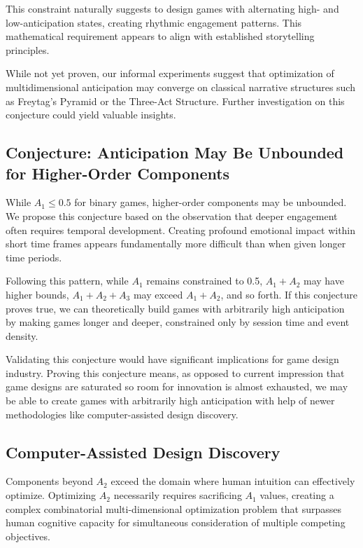 \documentclass{article}
\begin{document}
This constraint naturally suggests to design games with alternating high- and low-anticipation states, creating rhythmic engagement patterns.
This mathematical requirement appears to align with established storytelling principles.

While not yet proven, our informal experiments suggest that optimization of multidimensional anticipation may converge on classical narrative structures such as Freytag's Pyramid or the Three-Act Structure.
Further investigation on this conjecture could yield valuable insights.

\subsection{Conjecture: Anticipation May Be Unbounded for Higher-Order Components}

While $A_1 \leq 0.5$ for binary games, higher-order components may be unbounded. We propose this conjecture based on the observation that deeper engagement often requires temporal development.
Creating profound emotional impact within short time frames appears fundamentally more difficult than when given longer time periods.

Following this pattern, while $A_1$ remains constrained to 0.5, $A_1+A_2$ may have higher bounds, $A_1+A_2+A_3$ may exceed $A_1+A_2$, and so forth. If this conjecture proves true, we can theoretically build games with arbitrarily high anticipation by making games longer and deeper, constrained only by session time and event density.

Validating this conjecture would have significant implications for game design industry.
Proving this conjecture means, as opposed to current impression that game designs are saturated so room for innovation is almost exhausted, we may be able to create games with arbitrarily high anticipation with help of newer methodologies like computer-assisted design discovery.

\subsection{Computer-Assisted Design Discovery}

Components beyond $A_2$ exceed the domain where human intuition can effectively optimize. Optimizing $A_2$ necessarily requires sacrificing $A_1$ values, creating a complex combinatorial multi-dimensional optimization problem that surpasses human cognitive capacity for simultaneous consideration of multiple competing objectives.
\end{document}
